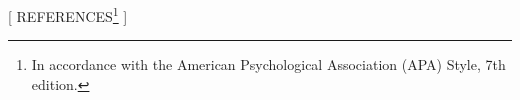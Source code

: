 \usepackage[
    style=apa,
    backend=biber,
    language=english,
    url=true,
    useprefix=false,
    giveninits=true
]{biblatex}

\usepackage{csquotes}


\renewcommand{\bibname}{REFERENCES}
\newcommand{\newbibname}{REFERENCES}

\newcommand{\bibnamewithfootnote}{
    \newbibname\protect\footnote{
        In accordance with the American Psychological Association (APA) Style, 7th edition.
    }
}

\setlength{\bibhang}{0.5cm}
\setlength{\bibparsep}{1ex}


[\bibnamewithfootnote]{
}

\AtBeginBibliography{\vspace{0.5\baselineskip}}
\renewcommand{\bibfont}{\ABNTEXfontereduzida}
